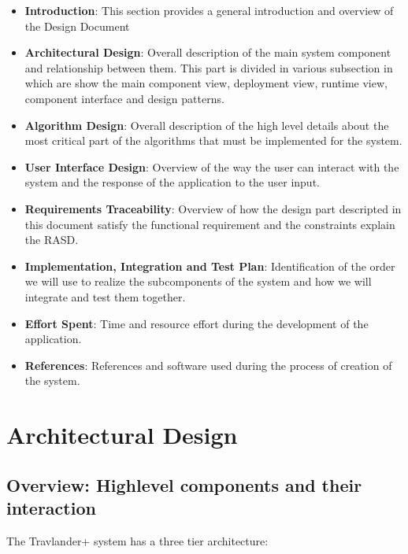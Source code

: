 \documentclass[numbers=noenddot, 12pt, a4paper, oneside]{scrbook}
\begin{document}
\begin{itemize}
	\item \textbf{Introduction}: This section provides a general introduction and overview of the Design Document
	\item \textbf{Architectural Design}: Overall description of the main system component and relationship between them. This part is divided in various subsection in which are show the main component view, deployment view, runtime view, component interface and design patterns.
	\item \textbf{Algorithm Design}: Overall description of the high level details about the most critical part of the algorithms that must be implemented for the system.
	\item \textbf{User Interface Design}: Overview of the way the user can interact with the system and the response of the application to the user input.
	\item \textbf{Requirements Traceability}: Overview of how the design part descripted in this document
	satisfy the functional requirement and the constraints explain the RASD.
	\item \textbf{Implementation, Integration and Test Plan}: Identification of the order we will use to realize the subcomponents of the system and how we will integrate and test them together.
	\item \textbf{Effort Spent}: Time and resource effort during the development of the application.
	\item \textbf{References}: References and software used during the process of creation of the system.
\end{itemize}




\chapter{Architectural Design}

\section{Overview: Highlevel components	and their interaction}

The Travlander+ system has a three tier architecture:
\end{document}
